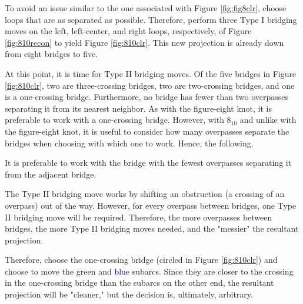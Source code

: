 \documentclass[titlepage]{article}
\begin{document}
To avoid an issue similar to the one associated with Figure \ref{fig:fig8clr}, choose loops that are as separated as possible. Therefore, perform three Type I bridging moves on the left, left-center, and right loops, respectively, of Figure \ref{fig:810recon} to yield Figure \ref{fig:810clr}. This new projection is already down from eight bridges to five.\par
At this point, it is time for Type II bridging moves. Of the five bridges in Figure \ref{fig:810clr}, two are three-crossing bridges, two are two-crossing bridges, and one is a one-crossing bridge. Furthermore, no bridge has fewer than two overpasses separating it from its nearest neighbor. As with the figure-eight knot, it is preferable to work with a one-crossing bridge. However, with $8_{10}$ and unlike with the figure-eight knot, it is useful to consider how many overpasses separate the bridges when choosing with which one to work. Hence, the following.\par

\begin{conj}
    It is preferable to work with the bridge with the fewest overpasses separating it from the adjacent bridge.
\end{conj}

The Type II bridging move works by shifting an obstruction (a crossing of an overpass) out of the way. However, for every overpass between bridges, one Type II bridging move will be required. Therefore, the more overpasses between bridges, the more Type II bridging moves needed, and the "messier" the resultant projection.\par
Therefore, choose the one-crossing bridge (circled in Figure \ref{fig:810clr}) and choose to move the \textcolor{grx}{green} and \textcolor{blue}{blue} subarcs. Since they are closer to the crossing in the one-crossing bridge than the subarcs on the other end, the resultant projection will be "cleaner," but the decision is, ultimately, arbitrary.\par
\end{document}
